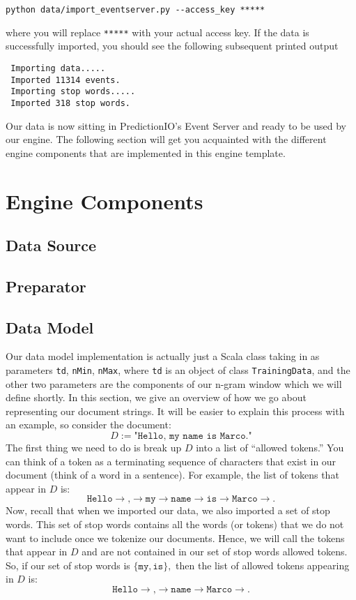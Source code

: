 \documentclass[a4paper,12pt]{article}
\renewcommand{\tt}[1]{\texttt{#1}}
\newcommand{\3}{\left}
\newcommand{\4}{\right}
\renewcommand{\-}[1]{{}^{-#1}}
\begin{document}
\begin{verbatim}
python data/import_eventserver.py --access_key *****
\end{verbatim}

where you will replace \tt{*****} with your actual access key. If the data is successfully imported, you should see the following subsequent printed output
 
 \begin{verbatim}
 Importing data.....
 Imported 11314 events.
 Importing stop words.....
 Imported 318 stop words.
 \end{verbatim}
 
Our data is now sitting in PredictionIO's Event Server and ready to be used by our engine. The following section will get you acquainted with the different engine components that are implemented in this engine template.

\break

\section*{Engine Components}

\subsection*{Data Source}

\subsection*{Preparator}

\subsection*{Data Model}

Our data model implementation is actually just a Scala class taking in as parameters \tt{td}, \tt{nMin}, \tt{nMax}, where \tt{td} is an object of class \tt{TrainingData}, and the other two parameters are the components of our n-gram window which we will define shortly. In this section, we give an overview of how we go about representing our document strings. It will be easier to explain this process with an example, so consider the document:
$$
D := \tt{"Hello, my name is Marco."}
$$
The first thing we need to do is break up $D$ into a list of \enquote{allowed tokens.} You can think of a token as a terminating sequence of characters that exist in our document (think of a word in a sentence). For example, the list of tokens that appear in $D$ is:
$$
\tt{Hello} \to \tt{,} \to \tt{my} \to \tt{name} \to \tt{is} \to \tt{Marco} \to \tt{.}
$$
Now, recall that when we imported our data, we also imported a set of stop words. This set of stop words contains all the words (or tokens) that we do not want to include once we tokenize our documents. Hence, we will call the tokens that appear in $D$ and are not contained in our set of stop words allowed tokens. So, if our set of stop words is $\{\tt{my}, \tt{is}\},$ then the list of allowed tokens appearing in $D$ is:
$$
\tt{Hello} \to \tt{,} \to \tt{name} \to \tt{Marco} \to \tt{.}
$$
\end{document}
